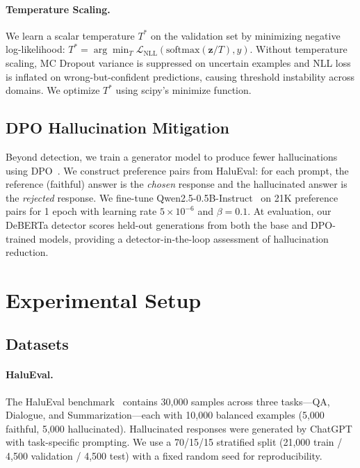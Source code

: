 \documentclass[11pt]{article}
\begin{document}
\paragraph{Temperature Scaling.} We learn a scalar temperature $T^*$ on the validation set by minimizing negative log-likelihood: $T^* = \arg\min_T \mathcal{L}_{\text{NLL}}(\text{softmax}(\mathbf{z}/T), y)$. Without temperature scaling, MC Dropout variance is suppressed on uncertain examples and NLL loss is inflated on wrong-but-confident predictions, causing threshold instability across domains. We optimize $T^*$ using scipy's minimize function.

\subsection{DPO Hallucination Mitigation}

Beyond detection, we train a generator model to produce fewer hallucinations using DPO~\citep{rafailov2023direct}. We construct preference pairs from HaluEval: for each prompt, the reference (faithful) answer is the \textit{chosen} response and the hallucinated answer is the \textit{rejected} response. We fine-tune Qwen2.5-0.5B-Instruct~\citep{qwen2025qwen25} on 21K preference pairs for 1 epoch with learning rate $5 \times 10^{-6}$ and $\beta=0.1$. At evaluation, our DeBERTa detector scores held-out generations from both the base and DPO-trained models, providing a detector-in-the-loop assessment of hallucination reduction.


\section{Experimental Setup}

\subsection{Datasets}

\paragraph{HaluEval.} The HaluEval benchmark~\citep{li2023halueval} contains 30,000 samples across three tasks---QA, Dialogue, and Summarization---each with 10,000 balanced examples (5,000 faithful, 5,000 hallucinated). Hallucinated responses were generated by ChatGPT with task-specific prompting. We use a 70/15/15 stratified split (21,000 train / 4,500 validation / 4,500 test) with a fixed random seed for reproducibility.
\end{document}
